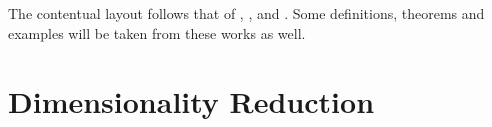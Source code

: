The contentual layout follows that of \cite{Coifman20065}, \cite{Nadler2006113}, \cite{Nadler2008} and \cite{Belkin2003}. Some definitions, theorems and examples will be taken from these works as well.

\section{Dimensionality Reduction}

